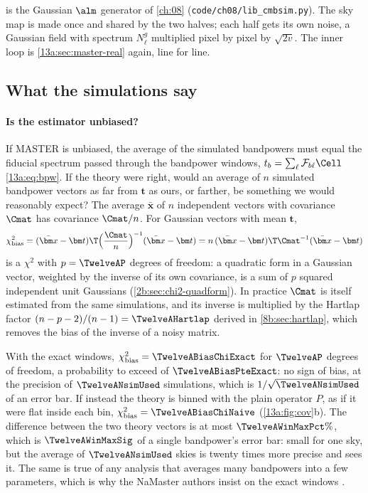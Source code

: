 
\noindent {} is the Gaussian $\alm$ generator of \cref{ch:08} (\texttt{code/ch08/lib\_cmbsim.py}).
The sky map is made once and shared by the two halves; each half gets its own noise, a Gaussian field with
spectrum $N^g_\ell$ multiplied pixel by pixel by $\sqrt{2v}$. The inner loop is \cref{13a:sec:master-real} again,
line for line.

\subsection{What the simulations say}
\label{13a:sec:cov}

\paragraph{Is the estimator unbiased?} If MASTER is unbiased, the average of the simulated bandpowers must
equal the fiducial spectrum passed through the bandpower windows, $t_b=\sum_\ell\mathcal F_{b\ell}\Cell$
\eqref{13a:eq:bpw}. If the theory were right, would an average of $n$ simulated
bandpower vectors as far from $\bm t$ as ours, or farther, be something we would reasonably expect? The average
$\bar{\bm x}$ of $n$ independent vectors with covariance $\Cmat$ has covariance $\Cmat/n$. For Gaussian vectors with
mean $\bm t$,
\begin{equation}
  \chi^2_{\rm bias}=(\bar{\bm x}-\bm t)\T\Bigl(\frac{\Cmat}{n}\Bigr)^{-1}(\bar{\bm x}-\bm t)
  =n\,(\bar{\bm x}-\bm t)\T\Cmat^{-1}(\bar{\bm x}-\bm t)
  \label{13a:eq:bias-chi2}
\end{equation}
is a $\chi^2$ with $p=\TwelveAP$ degrees of freedom: a quadratic form in a Gaussian vector, weighted by the
inverse of its own covariance, is a sum of $p$ squared independent unit Gaussians (\cref{2b:sec:chi2-quadform}).
In practice $\Cmat$ is itself estimated from the same simulations, and its inverse is multiplied by the
Hartlap factor $(n-p-2)/(n-1)=\TwelveAHartlap$ derived in \cref{8b:sec:hartlap}, which removes the bias of the
inverse of a noisy matrix.

With the exact windows, $\chi^2_{\rm bias}=\TwelveABiasChiExact$ for $\TwelveAP$ degrees of freedom, a probability
to exceed of $\TwelveABiasPteExact$: no sign of bias, at the precision of $\TwelveANsimUsed$ simulations, which
is $1/\sqrt{\TwelveANsimUsed}$ of an error bar. If instead the theory is binned with the plain operator $P$, as
if it were flat inside each bin, $\chi^2_{\rm bias}=\TwelveABiasChiNaive$ (\cref{13a:fig:cov}b). The difference
between the two theory vectors is at most $\TwelveAWinMaxPct\%$, which is $\TwelveAWinMaxSig$ of a single
bandpower's error bar: small for one sky, but the average of $\TwelveANsimUsed$ skies is twenty times more
precise and sees it. The same is true of any analysis that averages many bandpowers into a few parameters, which
is why the NaMaster authors insist on the exact windows \cite[§2.1, Fig.~10]{Alonso2019}.

